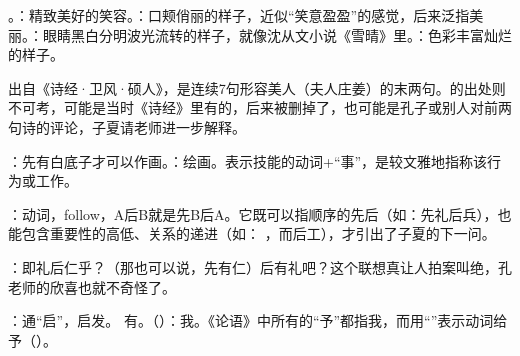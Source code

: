 {
\begin{lyblobitemize}
\item {}。：精致美好的笑容。：口颊俏丽的样子，近似“笑意盈盈”的感觉，后来泛指美丽。：眼睛黑白分明波光流转的样子，就像沈从文小说《雪晴》里。：色彩丰富灿烂的样子。

出自《诗经·卫风·硕人》，是连续7句形容美人（夫人庄姜）的末两句。的出处则不可考，可能是当时《诗经》里有的，后来被删掉了，也可能是孔子或别人对前两句诗的评论，子夏请老师进一步解释。
\item {}：先有白底子才可以作画。：绘画。表示技能的动词+“事”，是较文雅地指称该行为或工作。

：动词，follow，A后B就是先B后A。它既可以指顺序的先后（如：先礼后兵），也能包含重要性的高低、关系的递进（如： ，而后工），才引出了子夏的下一问。

\item {}：即礼后仁乎？（那也可以说，先有仁）后有礼吧？这个联想真让人拍案叫绝，孔老师的欣喜也就不奇怪了。
\item {}：通“启”，启发。 有。（）：我。《论语》中所有的“予”都指我，而用“”表示动词给予（）。
\end{lyblobitemize}
}
{}
%


